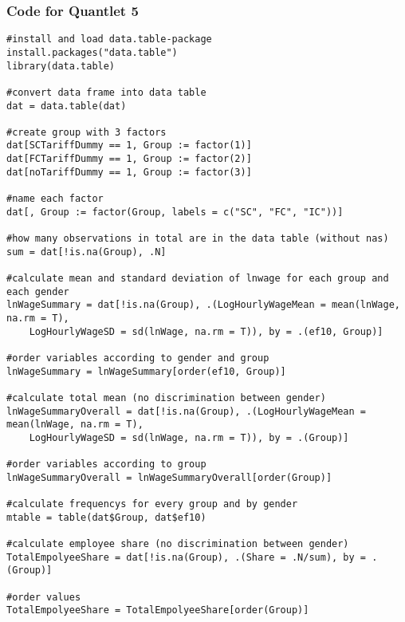 \subsubsection{Code for Quantlet 5}
\lstset{firstnumber = 314}
\begin{lstlisting}
#install and load data.table-package 
install.packages("data.table")    
library(data.table)   

#convert data frame into data table       
dat = data.table(dat)             		

#create group with 3 factors
dat[SCTariffDummy == 1, Group := factor(1)]   
dat[FCTariffDummy == 1, Group := factor(2)]
dat[noTariffDummy == 1, Group := factor(3)]

#name each factor
dat[, Group := factor(Group, labels = c("SC", "FC", "IC"))]	

#how many observations in total are in the data table (without nas)
sum = dat[!is.na(Group), .N]                       

#calculate mean and standard deviation of lnwage for each group and each gender
lnWageSummary = dat[!is.na(Group), .(LogHourlyWageMean = mean(lnWage, na.rm = T),
	LogHourlyWageSD = sd(lnWage, na.rm = T)), by = .(ef10, Group)]  

#order variables according to gender and group
lnWageSummary = lnWageSummary[order(ef10, Group)]               

#calculate total mean (no discrimination between gender)                     
lnWageSummaryOverall = dat[!is.na(Group), .(LogHourlyWageMean = mean(lnWage, na.rm = T),
	LogHourlyWageSD = sd(lnWage, na.rm = T)), by = .(Group)]

#order variables according to group
lnWageSummaryOverall = lnWageSummaryOverall[order(Group)]

#calculate frequencys for every group and by gender
mtable = table(dat$Group, dat$ef10)                                            

#calculate employee share (no discrimination between gender)
TotalEmpolyeeShare = dat[!is.na(Group), .(Share = .N/sum), by = .(Group)] 

#order values    
TotalEmpolyeeShare = TotalEmpolyeeShare[order(Group)]                          


\end{lstlisting}
